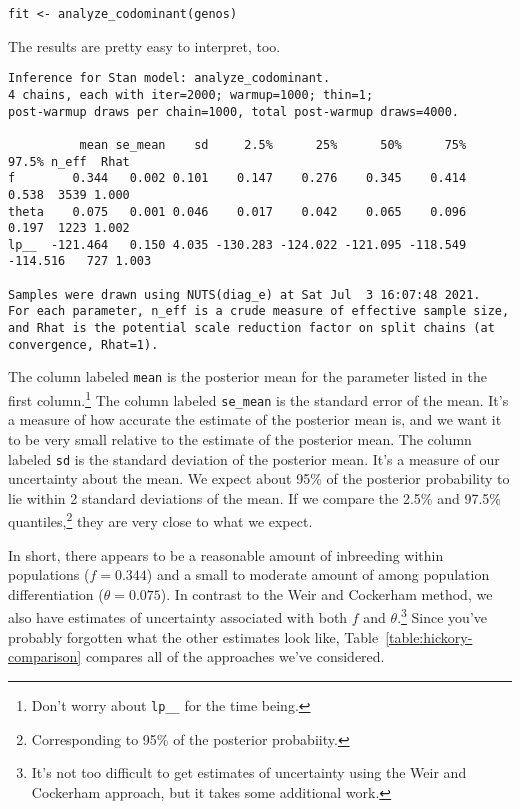 \begin{verbatim}
fit <- analyze_codominant(genos)
\end{verbatim}
The results are pretty easy to interpret, too.
{\small
\begin{verbatim}
Inference for Stan model: analyze_codominant.
4 chains, each with iter=2000; warmup=1000; thin=1; 
post-warmup draws per chain=1000, total post-warmup draws=4000.

          mean se_mean    sd     2.5%      25%      50%      75%    97.5% n_eff  Rhat
f        0.344   0.002 0.101    0.147    0.276    0.345    0.414    0.538  3539 1.000
theta    0.075   0.001 0.046    0.017    0.042    0.065    0.096    0.197  1223 1.002
lp__  -121.464   0.150 4.035 -130.283 -124.022 -121.095 -118.549 -114.516   727 1.003

Samples were drawn using NUTS(diag_e) at Sat Jul  3 16:07:48 2021.
For each parameter, n_eff is a crude measure of effective sample size,
and Rhat is the potential scale reduction factor on split chains (at 
convergence, Rhat=1).
\end{verbatim}
}
The column labeled {\tt mean} is the posterior mean for the parameter
listed in the first column.\footnote{Don't worry about {\tt lp\_\_}
for the time being.} The column labeled {\tt se\_mean} is the standard
error of the mean. It's a measure of how accurate the estimate of the
posterior mean is, and we want it to be very small relative to the
estimate of the posterior mean. The column labeled {\tt sd} is the
standard deviation of the posterior mean. It's a measure of our
uncertainty about the mean. We expect about 95\% of the posterior
probability to lie within 2 standard deviations of the mean. If we
compare the 2.5\% and 97.5\% quantiles,\footnote{Corresponding to 95\%
  of the posterior probabiity.} they are very close to what we expect.

In short, there appears to be a reasonable amount of inbreeding within
populations ($f = 0.344$) and a small to moderate amount of among
population differentiation ($\theta = 0.075$). In contrast to the Weir
and Cockerham method, we also have estimates of uncertainty associated
with both $f$ and $\theta$.\footnote{It's not too difficult to get
  estimates of uncertainty using the Weir and Cockerham approach, but
  it takes some additional work.} Since you've probably forgotten what
the other estimates look like, Table~\ref{table:hickory-comparison}
compares all of the approaches we've considered.

